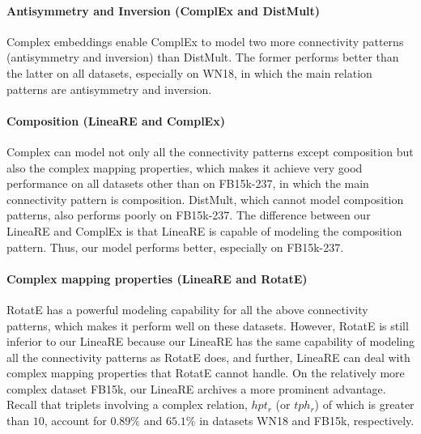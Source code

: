 \documentclass[conference]{IEEEtran}
\begin{document}
\paragraph{Antisymmetry and Inversion (ComplEx and DistMult)}
Complex embeddings enable ComplEx to model two more connectivity patterns (antisymmetry and inversion) than DistMult. The former performs better than the latter on all datasets, especially on WN18, in which the main relation patterns are antisymmetry and inversion.

\paragraph{Composition (LineaRE and ComplEx)}
Complex can model not only all the connectivity patterns except composition but also the complex mapping properties, which makes it achieve very good performance on all datasets other than on FB15k-237, in which the main connectivity pattern is composition. DistMult, which cannot model composition patterns, also performs poorly on FB15k-237. The difference between our LineaRE and ComplEx is that LineaRE is capable of modeling the composition pattern. Thus, our model performs better, especially on FB15k-237.

\paragraph{Complex mapping properties (LineaRE and RotatE)}
RotatE has a powerful modeling capability for all the above connectivity patterns, which makes it perform well on these datasets. However, RotatE is still inferior to our LineaRE because our LineaRE has the same capability of modeling all the connectivity patterns as RotatE does, and further, LineaRE can deal with complex mapping properties that RotatE cannot handle. On the relatively more complex dataset FB15k, our LineaRE archives a more prominent advantage. Recall that triplets involving a complex relation, $hpt_r$ (or $tph_r$) of which is greater than $10$, account for $0.89\%$ and $65.1\%$ in datasets WN18 and FB15k, respectively.
\end{document}
